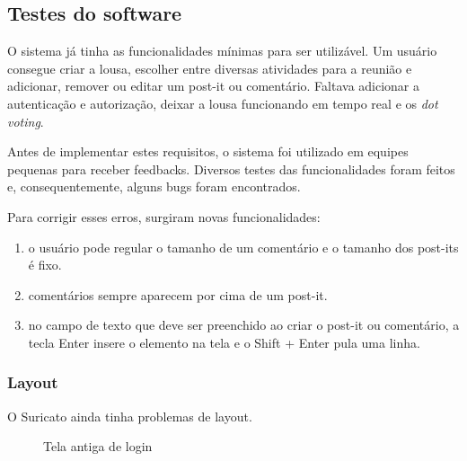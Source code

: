 \subsection{Testes do software}

O sistema já tinha as funcionalidades mínimas para ser utilizável. Um usuário consegue criar a lousa, escolher entre diversas atividades para a reunião e adicionar, remover ou editar um post-it ou comentário. Faltava adicionar a autenticação e autorização, deixar a lousa funcionando em tempo real e os \textit{dot voting}.

Antes de implementar estes requisitos, o sistema foi utilizado em equipes pequenas para receber feedbacks. Diversos testes das funcionalidades foram feitos e, consequentemente, alguns bugs foram encontrados.

Para corrigir esses erros, surgiram novas funcionalidades:

\begin{enumerate}
	\item o usuário pode regular o tamanho de um comentário e o tamanho dos post-its é fixo.
	\item comentários sempre aparecem por cima de um post-it.
	\item no campo de texto que deve ser preenchido ao criar o post-it ou comentário, a tecla Enter insere o elemento na tela e o Shift + Enter pula uma linha.
\end{enumerate}

\subsubsection*{Layout}
O Suricato ainda tinha problemas de layout. 

\begin{figure}[H]
  \centering
  \caption{Tela antiga de login}\label{figura:loginAntigo}
\end{figure}

